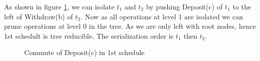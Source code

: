 \documentclass[12pt]{article}
\begin{document}
As shown in figure \ref{fig:2}, we can isolate $t_1$ and $t_2$ by pushing Deposit(c) of $t_1$ to the left of Withdraw(b) of $t_2$.
Now as all operations at level 1 are isolated we can prune operations at level 0 in the tree. As we are only left with root nodes, hence 1st schedult is tree reducible.
The serialization order is $t_1$ then $t_2$.
\begin{figure}[h]
    \centering
    \caption{Commute of Deposit(c) in 1st schedule}
    \label{fig:2}
\end{figure}\\
\end{document}
